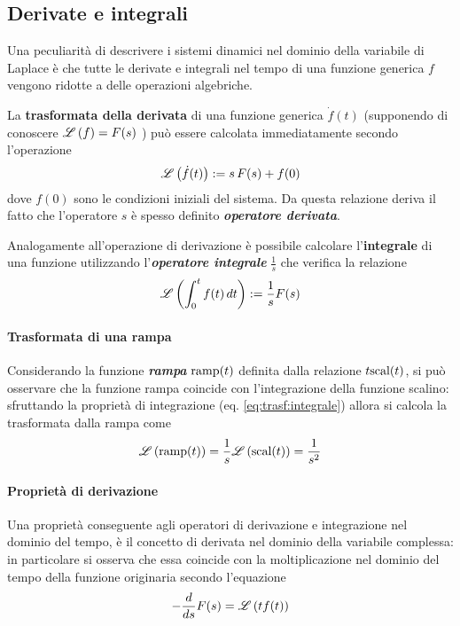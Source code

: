 	\subsection{Derivate e integrali}
		Una peculiarità di descrivere i sistemi dinamici nel dominio della variabile di Laplace è che tutte le derivate e integrali nel tempo di una funzione generica $f$ vengono ridotte a delle operazioni algebriche.
		\begin{concetto}
			La \textbf{trasformata della derivata} di una funzione generica $\dot f(t)$ (supponendo di conoscere $\mathscr L \left( f \right) = F(s)$ ) può essere calcolata immediatamente secondo l'operazione
			\begin{equation}
				\mathscr L \left( \dot f(t) \right) := s \, F(s) + f(0)
			\end{equation}
			dove $f(0)$ sono le condizioni iniziali del sistema. Da questa relazione deriva il fatto che l'operatore $s$ è spesso definito \textbf{\textit{operatore derivata}}.
			\vspace{2mm}
			
			Analogamente all'operazione di derivazione è possibile calcolare l'\textbf{integrale} di una funzione utilizzando l'\textbf{\textit{operatore integrale}} $\frac 1 s$ che verifica la relazione
			\begin{equation} \label{eq:trasf:integrale}
				\mathscr L \left( \int_0^t f(t)\, dt \right) : = \frac 1 s F(s)
			\end{equation}
		\end{concetto}
	
		\paragraph{Trasformata di una rampa} Considerando la funzione \textbf{\textit{rampa}} $\textrm{ramp}(t)$ definita dalla relazione $t \textrm{scal}(t)$, si può osservare che la funzione rampa coincide con l'integrazione della funzione scalino: sfruttando la proprietà di integrazione (eq. \ref{eq:trasf:integrale}) allora si calcola la trasformata dalla rampa come
		\begin{equation}
			\mathscr L \left( \textrm{ramp}(t) \right) = \frac 1 s \mathscr L \left( \textrm{scal}(t) \right) = \frac{1}{s^2}
		\end{equation}
		
		\paragraph{Proprietà di derivazione} Una proprietà conseguente agli operatori di derivazione e integrazione nel dominio del tempo, è il concetto di derivata nel dominio della variabile complessa: in particolare si osserva che essa coincide con la moltiplicazione nel dominio del tempo della funzione originaria secondo l'equazione
		\begin{equation}
			- \frac d {ds}F(s) = \mathscr L \left( t f(t) \right)
		\end{equation}
		
